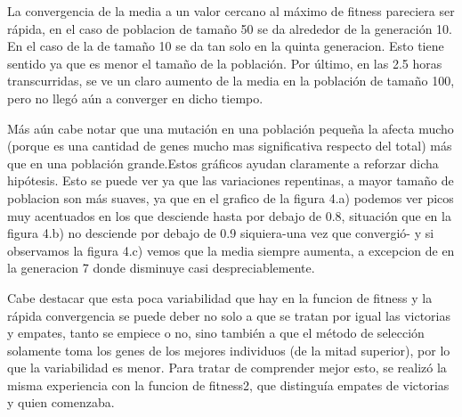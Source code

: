 \documentclass[A4paper,oneside,fleqn,11pt]{article}
\theoremstyle{definition}
\begin{document}
La convergencia de la media a un valor cercano al máximo de fitness pareciera ser rápida, en el caso de poblacion de tamaño 50 se da alrededor de la generación 10. En el caso de la de tamaño 10 se da tan solo en la quinta generacion. Esto tiene sentido ya que es menor el tamaño de la población. Por último, en las 2.5 horas transcurridas, se ve un claro aumento de la media en la población de tamaño 100, pero no llegó aún a converger en dicho tiempo.

Más aún cabe notar que una mutación en una población pequeña la afecta mucho (porque es una cantidad de genes mucho mas significativa respecto del total) más que en una población grande.Estos gráficos ayudan claramente a reforzar dicha hipótesis. Esto se puede ver ya que las variaciones repentinas, a mayor tamaño de poblacion son más suaves, ya que en el grafico de la figura 4.a) podemos ver picos muy acentuados en los que desciende hasta por debajo de 0.8, situación que en la figura 4.b) no desciende por debajo de 0.9 siquiera-una vez que convergió- y si observamos la figura 4.c) vemos que la media siempre aumenta, a excepcion de en la generacion 7 donde disminuye casi despreciablemente. 

Cabe destacar que esta poca variabilidad que hay en la funcion de fitness y la rápida convergencia se puede deber no solo a que se tratan por igual las victorias y empates, tanto se empiece o no, sino también a que el método de selección solamente toma los genes de los mejores individuos (de la mitad superior), por lo que la variabilidad es menor. Para tratar de comprender mejor esto, se realizó la misma experiencia con la funcion de fitness2, que distinguía empates de victorias y quien comenzaba.
\end{document}
